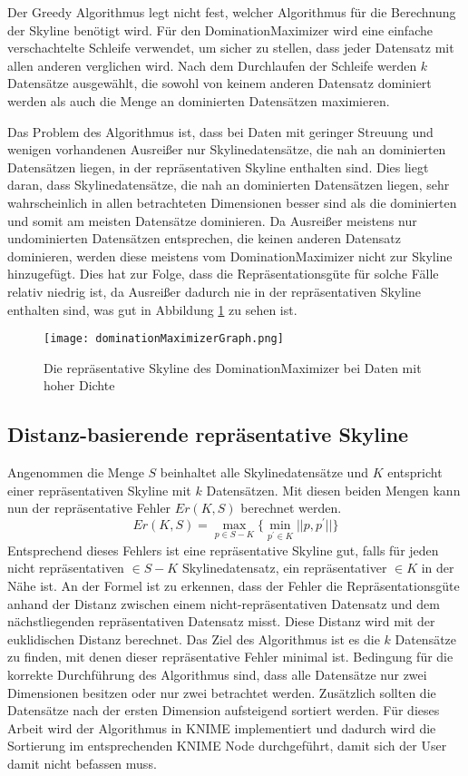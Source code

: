 Der Greedy Algorithmus legt nicht fest, welcher Algorithmus für die Berechnung der Skyline benötigt wird. Für den DominationMaximizer wird eine einfache verschachtelte Schleife verwendet, um sicher zu stellen, dass jeder Datensatz mit allen anderen verglichen wird. 
Nach dem Durchlaufen der Schleife werden $k$ Datensätze ausgewählt, die sowohl von keinem anderen Datensatz dominiert werden als auch die Menge an dominierten Datensätzen maximieren.

Das Problem des Algorithmus ist, dass bei Daten mit geringer Streuung und wenigen vorhandenen Ausreißer nur Skylinedatensätze, die nah an dominierten Datensätzen liegen, in der repräsentativen Skyline enthalten sind. Dies liegt daran, dass Skylinedatensätze, die nah an dominierten Datensätzen liegen, sehr wahrscheinlich in allen betrachteten Dimensionen besser sind als die dominierten und somit am meisten Datensätze dominieren.  Da Ausreißer meistens nur undominierten Datensätzen entsprechen, die keinen anderen Datensatz dominieren, werden diese meistens vom DominationMaximizer nicht zur Skyline hinzugefügt. Dies hat zur Folge, dass die Repräsentationsgüte für solche Fälle relativ niedrig ist, da Ausreißer dadurch nie in der repräsentativen Skyline enthalten sind, was gut in Abbildung \ref{img:dominationMaximizerGraph} zu sehen ist.
 
\begin{figure}[H]
	\centering
	\texttt{[image: dominationMaximizerGraph.png]}
	\caption{Die repräsentative Skyline des DominationMaximizer bei Daten mit hoher Dichte}
	\label{img:dominationMaximizerGraph}
\end{figure}
\subsection{Distanz-basierende repräsentative Skyline}
\label{ch:Analyse:sec:repSkyAlgos:subsec:disBasedRepSky}
Angenommen die Menge $S$ beinhaltet alle Skylinedatensätze und $K$ entspricht einer repräsentativen Skyline mit $k$ Datensätzen. Mit diesen beiden Mengen kann nun der repräsentative Fehler $Er(K,S)$ berechnet werden. 
$$Er(K,S)=\max\limits_{p\in{S-K}}\{\min\limits_{p^{'} \in{K}}||p,p^{'}||\}$$
Entsprechend dieses Fehlers ist eine repräsentative Skyline gut, falls für jeden nicht repräsentativen $\in{S-K}$ Skylinedatensatz, ein repräsentativer $\in{K}$ in der Nähe ist. An der Formel ist zu erkennen, dass der Fehler die Repräsentationsgüte anhand der Distanz zwischen einem nicht-repräsentativen Datensatz und dem nächstliegenden repräsentativen Datensatz misst. Diese Distanz wird mit der euklidischen Distanz berechnet.
Das Ziel des Algorithmus ist es die $k$ Datensätze zu finden, mit denen dieser repräsentative Fehler minimal ist. Bedingung für die korrekte Durchführung des Algorithmus sind, dass alle Datensätze nur zwei Dimensionen besitzen oder nur zwei betrachtet werden. Zusätzlich sollten die Datensätze nach der ersten Dimension aufsteigend sortiert werden. Für dieses Arbeit wird der Algorithmus in KNIME implementiert und dadurch wird die Sortierung im entsprechenden KNIME Node durchgeführt, damit sich der User damit nicht befassen muss. 

